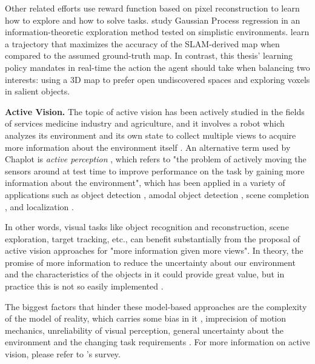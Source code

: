 Other related efforts use 
\cite{jayaraman2018learning} reward function based on pixel reconstruction to learn how to explore and how to solve tasks. 
\textcite{bai2016information} study Gaussian Process regression in an information-theoretic exploration method tested on simplistic environments.
\textcite{kollar2008trajectory} learn a trajectory that maximizes the accuracy of the SLAM-derived map when compared to the assumed ground-truth map.
In contrast, this thesis' learning policy mandates in real-time the action the agent should take when balancing two interests: using a 3D map to prefer open undiscovered spaces and exploring voxels in salient objects. 


\textbf{Active Vision.} %
The topic of active vision has been actively studied in the fields of services medicine industry and agriculture, and it involves a robot which analyzes its environment and its own state to collect multiple views to acquire more information about the environment itself \cite{zeng2020view}. An alternative term used by Chaplot is \textit{active perception} \cite{bajcsy1988active}, which refers to "the problem of actively moving the sensors around at test time to improve performance on the task by gaining more information about the environment", which has been applied in a variety of applications such as object detection \cite{ammirato2017dataset}, amodal object detection \cite{yang2019embodied}, scene completion
\cite{jayaraman2018learning}, and localization \cite{chaplot2018active, fox1998active}. 

In other words, visual tasks like object recognition and reconstruction, scene exploration, target tracking, etc., can benefit substantially from the proposal of active vision approaches for "more information given more views". 
In theory, the promise of more information to reduce the uncertainty about our environment and the characteristics of the objects in it could provide great value, but in practice this is not so easily implemented \cite{zeng2020view}.

The biggest factors that hinder these model-based approaches are the complexity of the model of reality, which carries some bias in it \cite{wang2018look}, imprecision of motion mechanics, unreliability of visual perception, general uncertainty about the environment and the changing task requirements \cite{vasquez2017view, palomeras2019autonomous}. For more information on active vision, please refer to \textcite{zeng2020view}'s survey.

